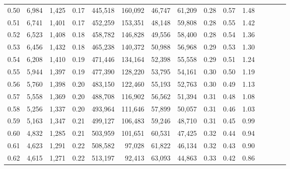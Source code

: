 \begin{tabular}{rrrcrrrrrrrrrrr}
0.50 &   6,984 &   1,425 &                                       0.17 &  445,518 &  160,092 &   46,747 &   61,209 &  0.28 &  0.57 &                         1.48 \\
0.51 &   6,741 &   1,401 &                                       0.17 &  452,259 &  153,351 &   48,148 &   59,808 &  0.28 &  0.55 &                         1.42 \\
0.52 &   6,523 &   1,408 &                                       0.18 &  458,782 &  146,828 &   49,556 &   58,400 &  0.28 &  0.54 &                         1.36 \\
0.53 &   6,456 &   1,432 &                                       0.18 &  465,238 &  140,372 &   50,988 &   56,968 &  0.29 &  0.53 &                         1.30 \\
0.54 &   6,208 &   1,410 &                                       0.19 &  471,446 &  134,164 &   52,398 &   55,558 &  0.29 &  0.51 &                         1.24 \\
0.55 &   5,944 &   1,397 &                                       0.19 &  477,390 &  128,220 &   53,795 &   54,161 &  0.30 &  0.50 &                         1.19 \\
0.56 &   5,760 &   1,398 &                                       0.20 &  483,150 &  122,460 &   55,193 &   52,763 &  0.30 &  0.49 &                         1.13 \\
0.57 &   5,558 &   1,369 &                                       0.20 &  488,708 &  116,902 &   56,562 &   51,394 &  0.31 &  0.48 &                         1.08 \\
0.58 &   5,256 &   1,337 &                                       0.20 &  493,964 &  111,646 &   57,899 &   50,057 &  0.31 &  0.46 &                         1.03 \\
0.59 &   5,163 &   1,347 &                                       0.21 &  499,127 &  106,483 &   59,246 &   48,710 &  0.31 &  0.45 &                         0.99 \\
0.60 &   4,832 &   1,285 &                                       0.21 &  503,959 &  101,651 &   60,531 &   47,425 &  0.32 &  0.44 &                         0.94 \\
0.61 &   4,623 &   1,291 &                                       0.22 &  508,582 &   97,028 &   61,822 &   46,134 &  0.32 &  0.43 &                         0.90 \\
0.62 &   4,615 &   1,271 &                                       0.22 &  513,197 &   92,413 &   63,093 &   44,863 &  0.33 &  0.42 &                         0.86 \\

\end{tabular}
